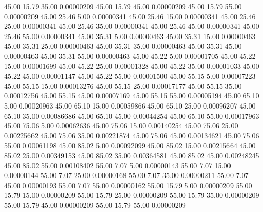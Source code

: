      45.00     15.79     35.00     0.00000209
     45.00     15.79     45.00     0.00000209
     45.00     15.79     55.00     0.00000209
     45.00     25.46      5.00     0.00000341
     45.00     25.46     15.00     0.00000341
     45.00     25.46     25.00     0.00000341
     45.00     25.46     35.00     0.00000341
     45.00     25.46     45.00     0.00000341
     45.00     25.46     55.00     0.00000341
     45.00     35.31      5.00     0.00000463
     45.00     35.31     15.00     0.00000463
     45.00     35.31     25.00     0.00000463
     45.00     35.31     35.00     0.00000463
     45.00     35.31     45.00     0.00000463
     45.00     35.31     55.00     0.00000463
     45.00     45.22      5.00     0.00001705
     45.00     45.22     15.00     0.00001699
     45.00     45.22     25.00     0.00001328
     45.00     45.22     35.00     0.00001033
     45.00     45.22     45.00     0.00001147
     45.00     45.22     55.00     0.00001500
     45.00     55.15      5.00     0.00007223
     45.00     55.15     15.00     0.00013276
     45.00     55.15     25.00     0.00017177
     45.00     55.15     35.00     0.00012756
     45.00     55.15     45.00     0.00007169
     45.00     55.15     55.00     0.00005194
     45.00     65.10      5.00     0.00020963
     45.00     65.10     15.00     0.00059866
     45.00     65.10     25.00     0.00096207
     45.00     65.10     35.00     0.00086686
     45.00     65.10     45.00     0.00044254
     45.00     65.10     55.00     0.00017963
     45.00     75.06      5.00     0.00062636
     45.00     75.06     15.00     0.00140254
     45.00     75.06     25.00     0.00225662
     45.00     75.06     35.00     0.00221874
     45.00     75.06     45.00     0.00134621
     45.00     75.06     55.00     0.00061198
     45.00     85.02      5.00     0.00092099
     45.00     85.02     15.00     0.00215664
     45.00     85.02     25.00     0.00349153
     45.00     85.02     35.00     0.00364581
     45.00     85.02     45.00     0.00248245
     45.00     85.02     55.00     0.00108402
     55.00      7.07      5.00     0.00000143
     55.00      7.07     15.00     0.00000144
     55.00      7.07     25.00     0.00000168
     55.00      7.07     35.00     0.00000211
     55.00      7.07     45.00     0.00000193
     55.00      7.07     55.00     0.00000162
     55.00     15.79      5.00     0.00000209
     55.00     15.79     15.00     0.00000209
     55.00     15.79     25.00     0.00000209
     55.00     15.79     35.00     0.00000209
     55.00     15.79     45.00     0.00000209
     55.00     15.79     55.00     0.00000209
